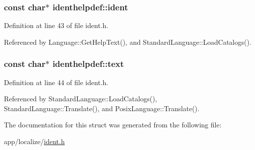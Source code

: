 \subsubsection[{\texorpdfstring{ident}{ident}}]{\setlength{\rightskip}{0pt plus 5cm}const char$\ast$ identhelpdef\+::ident}\hypertarget{structidenthelpdef_a9b9e38ad0068a6ee3c9a075f6412e10c}{}\label{structidenthelpdef_a9b9e38ad0068a6ee3c9a075f6412e10c}


Definition at line 43 of file ident.\+h.



Referenced by Language\+::\+Get\+Help\+Text(), and Standard\+Language\+::\+Load\+Catalogs().

\subsubsection[{\texorpdfstring{text}{text}}]{\setlength{\rightskip}{0pt plus 5cm}const char$\ast$ identhelpdef\+::text}\hypertarget{structidenthelpdef_ad2ce2c9f74dd7949618568812da41142}{}\label{structidenthelpdef_ad2ce2c9f74dd7949618568812da41142}


Definition at line 44 of file ident.\+h.



Referenced by Standard\+Language\+::\+Load\+Catalogs(), Standard\+Language\+::\+Translate(), and Posix\+Language\+::\+Translate().



The documentation for this struct was generated from the following file\+:\begin{DoxyCompactItemize}
\item 
app/localize/\hyperlink{ident_8h}{ident.\+h}\end{DoxyCompactItemize}
